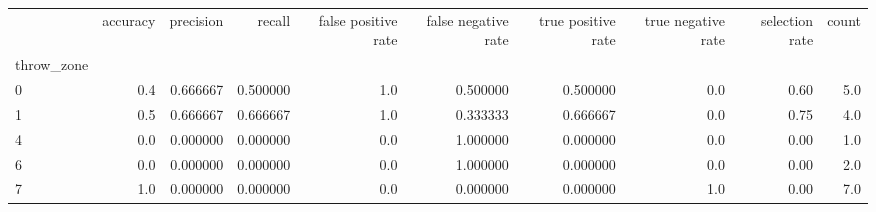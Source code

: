 \begin{tabular}{lrrrrrrrrr}
\toprule
{} &  accuracy &  precision &    recall &  false positive rate &  false negative rate &  true positive rate &  true negative rate &  selection rate &  count \\
throw\_zone &           &            &           &                      &                      &                     &                     &                 &        \\
\midrule
0          &       0.4 &   0.666667 &  0.500000 &                  1.0 &             0.500000 &            0.500000 &                 0.0 &            0.60 &    5.0 \\
1          &       0.5 &   0.666667 &  0.666667 &                  1.0 &             0.333333 &            0.666667 &                 0.0 &            0.75 &    4.0 \\
4          &       0.0 &   0.000000 &  0.000000 &                  0.0 &             1.000000 &            0.000000 &                 0.0 &            0.00 &    1.0 \\
6          &       0.0 &   0.000000 &  0.000000 &                  0.0 &             1.000000 &            0.000000 &                 0.0 &            0.00 &    2.0 \\
7          &       1.0 &   0.000000 &  0.000000 &                  0.0 &             0.000000 &            0.000000 &                 1.0 &            0.00 &    7.0 \\
\bottomrule
\end{tabular}
